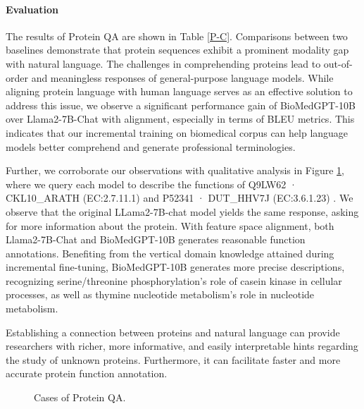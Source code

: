 \documentclass{article}
\begin{document}
\paragraph{Evaluation} 
The results of Protein QA are shown in Table \ref{P-C}. Comparisons between two baselines demonstrate that protein sequences exhibit a prominent modality gap with natural language. The challenges in comprehending proteins lead to out-of-order and meaningless responses of general-purpose language models. While aligning protein language with human language serves as an effective solution to address this issue, we observe a significant performance gain of BioMedGPT-10B over Llama2-7B-Chat with alignment, especially in terms of BLEU metrics. This indicates that our incremental training on biomedical corpus can help language models better comprehend and generate professional terminologies.

Further, we corroborate our observations with qualitative analysis in Figure \ref{protein}, where we query each model to describe the functions of Q9LW62 · CKL10\_ARATH (EC:2.7.11.1) \citep{Menges2002CellCG} and P52341 · DUT\_HHV7J (EC:3.6.1.23) \citep{Nicholas1996DeterminationAA}. We observe that the original LLama2-7B-chat model yields the same response, asking for more information about the protein. With feature space alignment, both Llama2-7B-Chat and BioMedGPT-10B generates reasonable function annotations. Benefiting from the vertical domain knowledge attained during incremental fine-tuning, BioMedGPT-10B generates more precise descriptions, recognizing serine/threonine phosphorylation's role of casein kinase in cellular processes, as well as thymine nucleotide metabolism's role in nucleotide metabolism.


Establishing a connection between proteins and natural language can provide researchers with richer, more informative, and easily interpretable hints regarding the study of unknown proteins. Furthermore, it can facilitate faster and more accurate protein function annotation.


\begin{figure}[htpb]
  \centering
  \vspace{-0.3cm}
  \caption{Cases of Protein QA.}
  \label{protein}
\end{figure}
\end{document}
